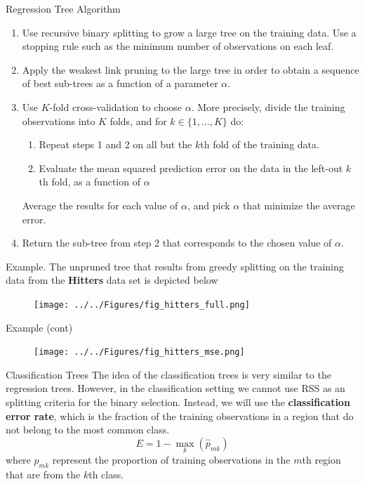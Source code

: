 \documentclass{beamer}
\begin{document}
\begin{frame}{Regression Tree Algorithm}
	\begin{enumerate}
		\item Use recursive binary splitting to grow a large tree on the training data. Use a stopping rule such as the minimum number of observations on each leaf.
		\item Apply the weakest link pruning  to the large tree in order to obtain a sequence of best sub-trees as a function of a parameter $\alpha$. 
		\item Use $K$-fold cross-validation to choose $\alpha$. More precisely, divide the training observations into $K$ folds, and for $k \in \{1,\ldots, K\}$ do:
		\begin{enumerate}
			\item Repeat steps 1 and 2 on all but the $k$th fold of the training data.
			\item Evaluate the mean squared prediction error on the data in the left-out $k$th fold, as a function of $\alpha$
		\end{enumerate} 
		Average the results for each value of $\alpha$, and pick $\alpha$ that minimize the average error.
		\item Return the sub-tree from step 2 that corresponds to the chosen value of $\alpha$.
	
	\end{enumerate}
\end{frame}

\begin{frame}{Example. }
	The unpruned tree that results from greedy splitting on the training data from the {\bf Hitters} data set is depicted below

\begin{figure}[h]
	\centering
	\texttt{[image: ../../Figures/fig\_hitters\_full.png]}
\end{figure}
\end{frame}

\begin{frame}{Example (cont)}
	\begin{figure}[h]
		\centering
		\texttt{[image: ../../Figures/fig\_hitters\_mse.png]}
	\end{figure}
\end{frame}

\begin{frame}{Classification Trees}
	The idea of the classification trees is very similar to the regression trees. However, in the classification setting we cannot use RSS as an splitting criteria for the binary selection. Instead, we will use the {\bf classification  error rate}, which is the fraction of the training observations in a region that do not belong to the most common class.
	\begin{equation*}
		E= 1- \max_k (\hat{p}_{mk})
	\end{equation*} 
	where $\hat{p}_{mk}$ represent the proportion of training observations in the $m$th region that are from the $k$th class.	
	

\end{frame}
\end{document}
